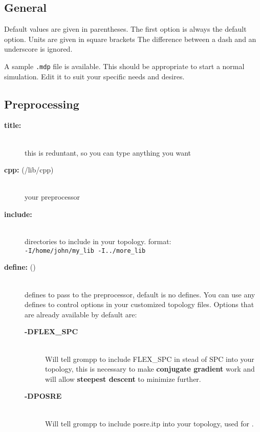 \subsection{General}

Default values are given in parentheses. The first option is
always the default option. Units are given in square brackets The
difference between a dash and an underscore is ignored. 

A sample {\tt .mdp} file is
available. This should be appropriate to start a normal
simulation. Edit it to suit your specific needs and desires. 

\subsection{Preprocessing}
\begin{description}
\item[{\bf title:}]\mbox{}\\
this is reduntant, so you can type anything you want
\item[{\bf cpp: }(/lib/cpp)]\mbox{}\\
your preprocessor
\item[{\bf include:}]\mbox{}\\
directories to include in your topology. format: 
\\{\tt-I/home/john/my\_lib -I../more\_lib}\\
\item[{\bf define: }()]\mbox{}\\
defines to pass to the preprocessor, default is no defines. You can use
any defines to control options in your customized topology files. Options
that are already available by default are:
\vspace{-2ex}\begin{description}
\item[{\bf -DFLEX\_SPC}]\mbox{}\\
Will tell grompp to include FLEX\_SPC in stead of SPC into your
topology, this is necessary to make 
{\bf conjugate gradient} work and will allow 
{\bf steepest descent} to minimize further.
\item[{\bf -DPOSRE}]\mbox{}\\
Will tell grompp to include posre.itp into your topology, used for
.
\end{description}
\end{description}

